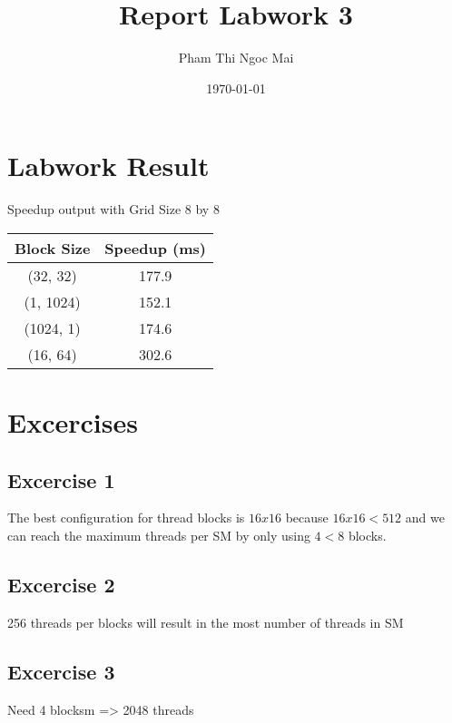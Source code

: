 \documentclass{article}
\title{Report Labwork 3}
\author{Pham Thi Ngoc Mai}
\date{\today}
\begin{document}
\maketitle

\section{Labwork Result}
Speedup output with Grid Size 8 by 8
\begin{center}
    \begin{tabular}{c|c}
        Block Size & Speedup (ms)  \\
        \hline
        (32, 32) & 177.9 \\
        (1, 1024) & 152.1 \\
        (1024, 1) & 174.6 \\
        (16, 64) & 302.6
    \end{tabular}
\end{center}

\section{Excercises}
\subsection{Excercise 1}
The best configuration for thread blocks is $16x16$ because $16x16<512$ and we can reach the maximum threads per SM by only using $4<8$ blocks.

\subsection{Excercise 2}
256 threads per blocks will result in the most number of threads in SM

\subsection{Excercise 3}
Need 4 blocksm => 2048 threads
\end{document}

